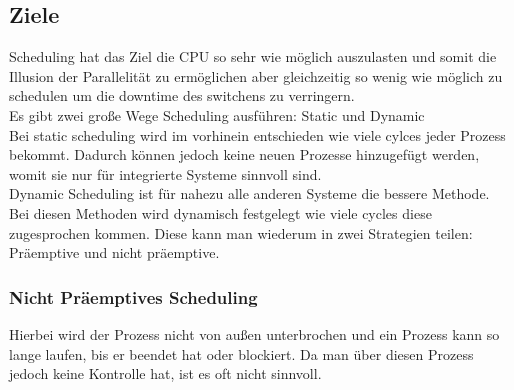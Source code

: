 \documentclass{article}
\begin{document}
	\subsection{Ziele}
	Scheduling hat das Ziel die CPU so sehr wie möglich auszulasten und somit die Illusion der Parallelität zu ermöglichen aber gleichzeitig so wenig wie möglich zu schedulen um die downtime des switchens zu verringern. \\
	Es gibt zwei große Wege Scheduling ausführen: Static und Dynamic \\
	Bei static scheduling wird im vorhinein entschieden wie viele cylces jeder Prozess bekommt. Dadurch können jedoch keine neuen Prozesse hinzugefügt werden, womit sie nur für integrierte Systeme sinnvoll sind. \\
	Dynamic Scheduling ist für nahezu alle anderen Systeme die bessere Methode. Bei diesen Methoden wird dynamisch festgelegt wie viele cycles diese zugesprochen kommen. Diese kann man wiederum in zwei Strategien teilen: Präemptive und nicht präemptive. \\
	\subsubsection{Nicht Präemptives Scheduling}
	Hierbei wird der Prozess nicht von außen unterbrochen und ein Prozess kann so lange laufen, bis er beendet hat oder blockiert. Da man über diesen Prozess jedoch keine Kontrolle hat, ist es oft nicht sinnvoll.
\end{document}
